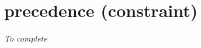 \section{precedence (constraint)}\label{precedence:precedenceconstraint}\hypertarget{precedence:precedenceconstraint}{}
\emph{To complete}
